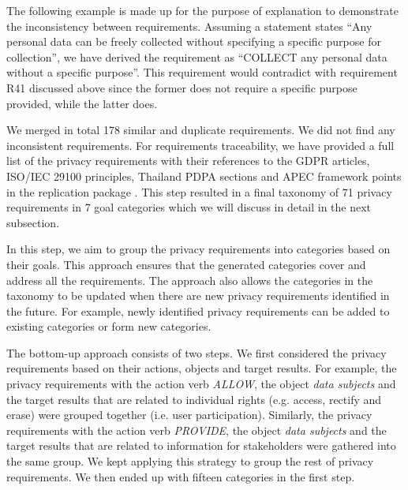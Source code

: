 The following example is made up for the purpose of explanation to demonstrate the inconsistency between requirements. Assuming a statement states ``Any personal data can be freely collected without specifying a specific purpose for collection'', we have derived the requirement as ``COLLECT any personal data without a specific purpose''. This requirement would contradict with requirement R41 discussed above since the former does not require a specific purpose provided, while the latter does.

We merged in total 178 similar and duplicate requirements. We did not find any inconsistent requirements. For requirements traceability, we have provided a full list of the privacy requirements with their references to the GDPR articles, ISO/IEC 29100 principles, Thailand PDPA sections and APEC framework points in the replication package \cite{reppkg-pridp}. This step resulted in a final taxonomy of 71 privacy requirements in 7 goal categories which we will discuss in detail in the next subsection.

 \label{subsec:req-classification}

In this step, we aim to group the privacy requirements into categories based on their goals.  This approach ensures that the generated categories cover and address all the requirements. The approach also allows the categories in the taxonomy to be updated when there are new privacy requirements identified in the future. For example, newly identified privacy requirements can be added to existing categories or form new categories.

The bottom-up approach consists of two steps. We first considered the privacy requirements based on their actions, objects and target results. For example, the privacy requirements with the action verb \emph{ALLOW}, the object \emph{data subjects} and the target results that are related to individual rights (e.g. access, rectify and erase) were grouped together (i.e. user participation). Similarly, the privacy requirements with the action verb \emph{PROVIDE}, the object \emph{data subjects} and the target results that are related to information for stakeholders were gathered into the same group. We kept applying this strategy to group the rest of privacy requirements. We then ended up with fifteen categories in the first step.

